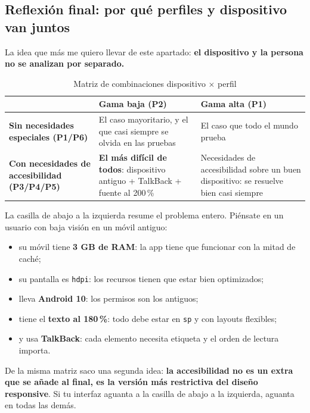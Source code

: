 \documentclass[11pt,a4paper]{article}
\newcommand{\code}[1]{\texttt{\color{ink}#1}}
\begin{document}
	\subsection{Reflexión final: por qué perfiles y dispositivo van juntos}
	
	La idea que más me quiero llevar de este apartado: \textbf{el dispositivo y la persona no se analizan por separado.}
	
	\begin{table}[htbp]
		\centering
		\begin{tabularx}{\textwidth}{@{}>{\RaggedRight\arraybackslash}p{3.3cm} >{\RaggedRight\arraybackslash}X >{\RaggedRight\arraybackslash}X@{}}
			\toprule
			\rowcolor{primary}
			\textcolor{paper}{\sffamily\bfseries} & \textcolor{paper}{\sffamily\bfseries Gama baja (P2)} & \textcolor{paper}{\sffamily\bfseries Gama alta (P1)} \\
			\midrule
			\textbf{Sin necesidades especiales (P1/P6)} & El caso mayoritario, y el que casi siempre se olvida en las pruebas & El caso que todo el mundo prueba \\
			\rowcolor{soft}
			\textbf{Con necesidades de accesibilidad (P3/P4/P5)} & \textbf{El más difícil de todos}: dispositivo antiguo + TalkBack + fuente al 200\,\% & Necesidades de accesibilidad sobre un buen dispositivo: se resuelve bien casi siempre \\
			\bottomrule
		\end{tabularx}
		\caption{Matriz de combinaciones dispositivo $\times$ perfil}
	\end{table}
	
	La casilla de abajo a la izquierda resume el problema entero. Piénsate en un usuario con baja visión en un móvil antiguo:
	\begin{itemize}[leftmargin=*,itemsep=0.15em]
		\item su móvil tiene \textbf{3 GB de RAM}: la app tiene que funcionar con la mitad de caché;
		\item su pantalla es \code{hdpi}: los recursos tienen que estar bien optimizados;
		\item lleva \textbf{Android 10}: los permisos son los antiguos;
		\item tiene el \textbf{texto al 180\,\%}: todo debe estar en \code{sp} y con layouts flexibles;
		\item y usa \textbf{TalkBack}: cada elemento necesita etiqueta y el orden de lectura importa.
	\end{itemize}
	
	De la misma matriz saco una segunda idea: \textbf{la accesibilidad no es un extra que se añade al final, es la versión más restrictiva del diseño responsive}. Si tu interfaz aguanta a la casilla de abajo a la izquierda, aguanta en todas las demás.
	
\end{document}
